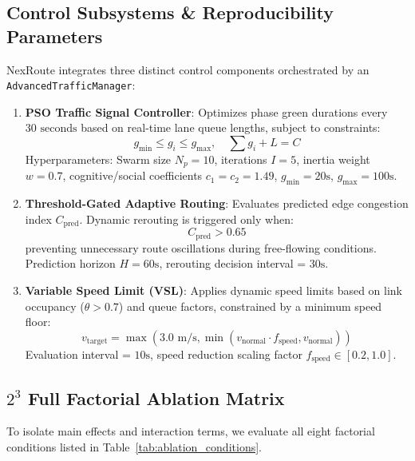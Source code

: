 \documentclass[journal,twocolumn]{IEEEtran}
\begin{document}
\subsection{Control Subsystems \& Reproducibility Parameters}
NexRoute integrates three distinct control components orchestrated by an \texttt{AdvancedTrafficManager}:

\begin{enumerate}
    \item \textbf{PSO Traffic Signal Controller}: Optimizes phase green durations every $30\text{ seconds}$ based on real-time lane queue lengths, subject to constraints:
    \begin{equation}
    g_{\min} \le g_i \le g_{\max}, \quad \sum g_i + L = C
    \end{equation}
    Hyperparameters: Swarm size $N_p = 10$, iterations $I = 5$, inertia weight $w = 0.7$, cognitive/social coefficients $c_1 = c_2 = 1.49$, $g_{\min} = 20\text{s}$, $g_{\max} = 100\text{s}$.
    
    \item \textbf{Threshold-Gated Adaptive Routing}: Evaluates predicted edge congestion index $C_{\text{pred}}$. Dynamic rerouting is triggered only when:
    \begin{equation}
    C_{\text{pred}} > 0.65
    \end{equation}
    preventing unnecessary route oscillations during free-flowing conditions. Prediction horizon $H = 60\text{s}$, rerouting decision interval = $30\text{s}$.
    
    \item \textbf{Variable Speed Limit (VSL)}: Applies dynamic speed limits based on link occupancy ($\theta > 0.7$) and queue factors, constrained by a minimum speed floor:
    \begin{equation}
    v_{\text{target}} = \max\left(3.0\text{ m/s}, \min\left(v_{\text{normal}} \cdot f_{\text{speed}}, v_{\text{normal}}\right)\right)
    \end{equation}
    Evaluation interval = $10\text{s}$, speed reduction scaling factor $f_{\text{speed}} \in [0.2, 1.0]$.
\end{enumerate}

\subsection{$2^3$ Full Factorial Ablation Matrix}
To isolate main effects and interaction terms, we evaluate all eight factorial conditions listed in Table~\ref{tab:ablation_conditions}.
\end{document}

